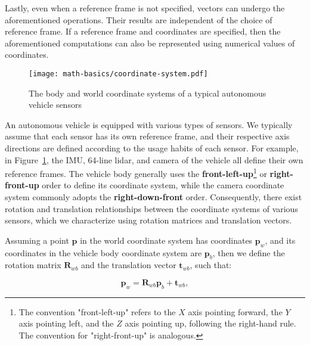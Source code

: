 Lastly, even when a reference frame is not specified, vectors can undergo the aforementioned operations. Their results are independent of the choice of reference frame. If a reference frame and coordinates are specified, then the aforementioned computations can also be represented using numerical values of coordinates.

\begin{figure}[!htp]
	\centering
	\texttt{[image: math-basics/coordinate-system.pdf]}
	\caption{The body and world coordinate systems of a typical autonomous vehicle sensors}
	\label{fig:corrdinate-system}
\end{figure}

An autonomous vehicle is equipped with various types of sensors. We typically assume that each sensor has its own reference frame, and their respective axis directions are defined according to the usage habits of each sensor. For example, in Figure~\ref{fig:corrdinate-system}, the IMU, 64-line lidar, and camera of the vehicle all define their own reference frames. The vehicle body generally uses the \textbf{front-left-up}\footnote{The convention "front-left-up" refers to the $X$ axis pointing forward, the $Y$ axis pointing left, and the $Z$ axis pointing up, following the right-hand rule. The convention for "right-front-up" is analogous.} or \textbf{right-front-up} order to define its coordinate system, while the camera coordinate system commonly adopts the \textbf{right-down-front} order. Consequently, there exist rotation and translation relationships between the coordinate systems of various sensors, which we characterize using rotation matrices and translation vectors.

Assuming a point $\mathbf{p}$ in the world coordinate system has coordinates $\mathbf{p}_w$, and its coordinates in the vehicle body coordinate system are $\mathbf{p}_b$, then we define the rotation matrix $\mathbf{R}_{wb}$ and the translation vector $\mathbf{t}_{wb}$, such that:

\begin{equation}
	\mathbf{p}_w = \mathbf{R}_{wb} \mathbf{p}_b + \mathbf{t}_{wb},
\end{equation}

